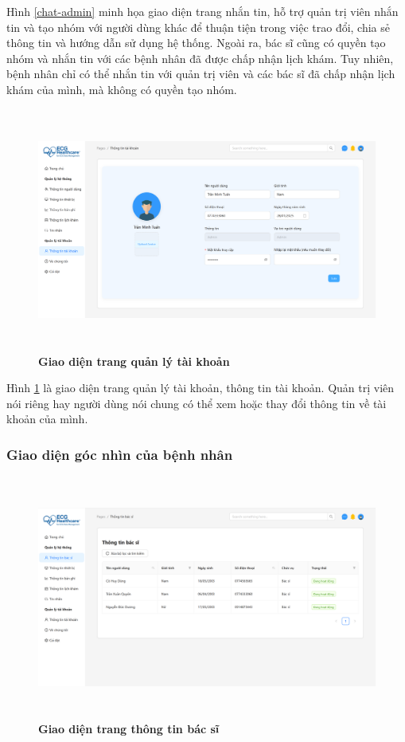 Hình \ref{chat-admin} minh họa giao diện trang nhắn tin, hỗ trợ quản trị viên nhắn tin và tạo nhóm với người dùng khác để thuận tiện trong việc trao đổi, chia sẻ thông tin và hướng dẫn sử dụng hệ thống.
Ngoài ra, bác sĩ cũng có quyền tạo nhóm và nhắn tin với các bệnh nhân đã được chấp nhận lịch khám.
Tuy nhiên, bệnh nhân chỉ có thể nhắn tin với quản trị viên và các bác sĩ đã chấp nhận lịch khám của mình, mà không có quyền tạo nhóm.

\begin{figure}[H]
	\centering
	\includegraphics[width=15cm,height=8cm]{Images/admin_ui/account.png}
	\caption[Giao diện trang quản lý tài khoản]{\bfseries \fontsize{12pt}{0pt}\selectfont Giao diện trang quản lý tài khoản}
	\label{account-admin}
\end{figure}

Hình \ref{account-admin} là giao diện trang quản lý tài khoản, thông tin tài khoản. Quản trị viên nói riêng hay người dùng nói chung có thể xem hoặc thay đổi thông tin về tài khoản của mình.

\subsubsection{Giao diện góc nhìn của bệnh nhân}
\begin{figure}[H]
	\centering
	\includegraphics[width=15cm,height=8cm]{Images/patient_ui/doctor-info.png}
	\caption[Giao diện trang thông tin bác sĩ]{\bfseries \fontsize{12pt}{0pt}\selectfont Giao diện trang thông tin bác sĩ}
	\label{doctor-info-patient}
\end{figure}

